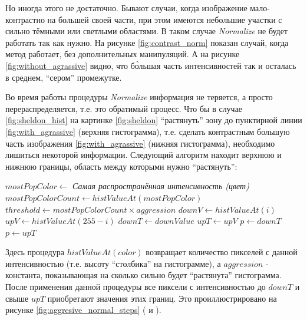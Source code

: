 \documentclass[12pt]{report}
\begin{document}
Но иногда этого не достаточно. Бывают случаи, когда изображение мало-контрастно на большей своей части, при этом 
имеются небольшие участки с сильно тёмными или светлыми областями. В таком случае \textit{Normalize} не будет 
работать так как нужно. На рисунке \ref{fig:contrast_norm} показан случай, когда метод работает, без дополнительных 
манипуляций. А на рисунке \ref{fig:without_agrassive} видно, что б\`{о}льшая часть интенсивностей так и осталась в 
среднем, ``сером'' промежутке.

\begin{figure}[h]
	\centering
	\caption{}
	\label{fig:aggresive_normal}
\end{figure}

Во время работы процедуры \textit{Normalize} информация не теряется, а просто перераспределяется, т.е. это 
обратимый 
процесс. Что бы в случае \ref{fig:sheldon_hist} на картинке \ref{fig:sheldon} ``растянуть'' зону до пунктирной 
линии 
\ref{fig:with_agrassive} (верхняя гистограмма), т.е. сделать контрастным 
большую часть изображения \ref{fig:with_agrassive} (нижняя гистограмма), необходимо лишиться некоторой информации. 
Следующий алгоритм находит верхнюю и нижнюю границы, область между которыми нужно ``растянуть'':

\begin{algorithmic}[1]
\STATE $mostPopColor\gets $ \emph{Самая распространённая интенсивность (цвет)}
\STATE $mostPopColorCount\gets histValueAt(mostPopColor)$ 
\STATE $threshold\gets mostPopColorCount\times{aggression}$
\STATE $downV\gets histValueAt(i)$
\STATE $upV\gets histValueAt(255-i)$
\STATE $downT\gets downValue$
\ENDIF
{}
\STATE $upT\gets upV$
\ENDIF
\ENDFOR
{} 
\STATE $p\gets downT$
\STATE $p\gets upT$	
\ENDIF
\ENDFOR
\end{algorithmic}

Здесь процедура $histValueAt(color)$ возвращает количество пикселей с данной интенсивностью (т.е. высоту 
``столбика'' 
на гистограмме), а $aggression$ - константа, показывающая на сколько сильно будет ``растянута'' гистограмма. После 
применения данной процедуры все пиксели с интенсивностью до $downT$ и свыше $upT$ приобретают значения этих границ. 
Это проиллюстрировано на рисунке \ref{fig:aggresive_normal_steps} ( и ).
\end{document}
